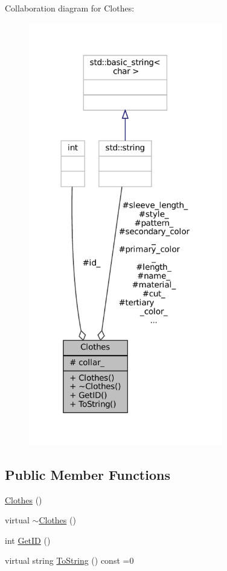 Collaboration diagram for Clothes\+:\nopagebreak
\begin{figure}[H]
\begin{center}
\leavevmode
\includegraphics[width=240pt]{classClothes__coll__graph}
\end{center}
\end{figure}
\subsection*{Public Member Functions}
\begin{DoxyCompactItemize}
\item 
\mbox{\hyperlink{classClothes_a3df0bb45365fe4b9c82fde551207aa18}{Clothes}} ()
\item 
virtual \mbox{\hyperlink{classClothes_a90ab914d23c6870f19e387922f48fe88}{$\sim$\+Clothes}} ()
\item 
int \mbox{\hyperlink{classClothes_a3f6dac172f333126d19010f85ec44e4c}{Get\+ID}} ()
\item 
virtual string \mbox{\hyperlink{classClothes_a953d143394e9a2c007ab0c3a638973cf}{To\+String}} () const =0
\end{DoxyCompactItemize}
